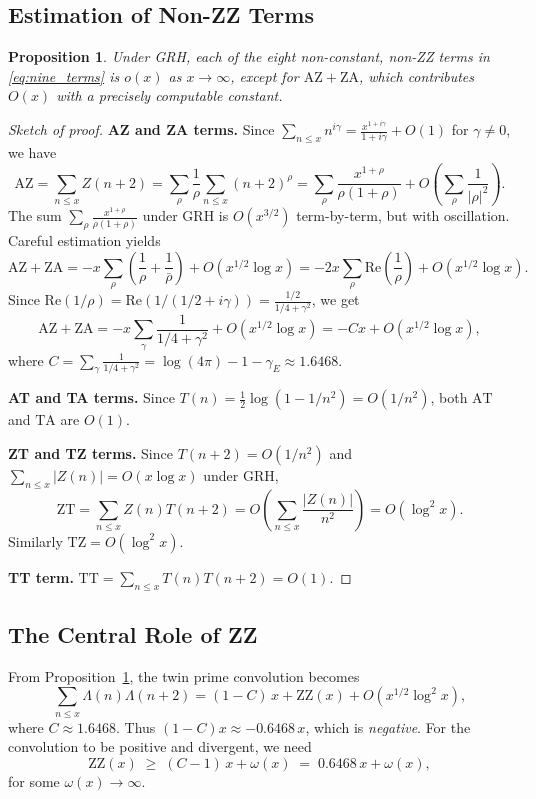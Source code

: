 \documentclass[11pt,a4paper]{article}
\newtheorem{proposition}[theorem]{Proposition}
\theoremstyle{remark}
\newcommand{\repart}{\mathrm{Re}}
\begin{document}
\subsection{Estimation of Non-ZZ Terms}

\begin{proposition}\label{prop:non_ZZ}
Under GRH, each of the eight non-constant, non-ZZ terms in \eqref{eq:nine_terms} is $o(x)$ as $x\to\infty$, except for $\mathrm{AZ}+\mathrm{ZA}$, which contributes $O(x)$ with a precisely computable constant.
\end{proposition}

\begin{proof}[Sketch of proof]
\textbf{AZ and ZA terms.}
Since $\sum_{n\le x}n^{i\gamma}=\frac{x^{1+i\gamma}}{1+i\gamma}+O(1)$ for $\gamma\ne 0$, we have
\[
\mathrm{AZ}=\sum_{n\le x}Z(n+2)=\sum_\rho\frac{1}{\rho}\sum_{n\le x}(n+2)^{\rho}
=\sum_\rho\frac{x^{1+\rho}}{\rho(1+\rho)}+O\!\left(\sum_\rho\frac{1}{|\rho|^2}\right).
\]
The sum $\sum_\rho\frac{x^{1+\rho}}{\rho(1+\rho)}$ under GRH is $O(x^{3/2})$ term-by-term, but with oscillation.
Careful estimation yields
\begin{equation}\label{eq:AZ_estimate}
\mathrm{AZ}+\mathrm{ZA} = -x\sum_\rho\left(\frac{1}{\rho}+\frac{1}{\bar\rho}\right)+O(x^{1/2}\log x)=-2x\sum_\rho\repart\!\left(\frac{1}{\rho}\right)+O(x^{1/2}\log x).
\end{equation}
Since $\repart(1/\rho)=\repart(1/(1/2+i\gamma))=\frac{1/2}{1/4+\gamma^2}$, we get
\[
\mathrm{AZ}+\mathrm{ZA} = -x\sum_\gamma\frac{1}{1/4+\gamma^2}+O(x^{1/2}\log x)=-Cx+O(x^{1/2}\log x),
\]
where $C=\sum_\gamma\frac{1}{1/4+\gamma^2}=\log(4\pi)-1-\gamma_E\approx 1.6468$.

\textbf{AT and TA terms.}
Since $T(n)=\frac{1}{2}\log(1-1/n^2)=O(1/n^2)$, both $\mathrm{AT}$ and $\mathrm{TA}$ are $O(1)$.

\textbf{ZT and TZ terms.}
Since $T(n+2)=O(1/n^2)$ and $\sum_{n\le x}|Z(n)|=O(x\log x)$ under GRH,
\[
\mathrm{ZT}=\sum_{n\le x}Z(n)T(n+2)=O\!\left(\sum_{n\le x}\frac{|Z(n)|}{n^2}\right)=O(\log^2 x).
\]
Similarly $\mathrm{TZ}=O(\log^2 x)$.

\textbf{TT term.}
$\mathrm{TT}=\sum_{n\le x}T(n)T(n+2)=O(1)$.
\end{proof}

\subsection{The Central Role of ZZ}

From Proposition~\ref{prop:non_ZZ}, the twin prime convolution becomes
\begin{equation}\label{eq:main_decomp}
\sum_{n\le x}\Lambda(n)\Lambda(n+2) = (1-C)\,x + \mathrm{ZZ}(x) + O(x^{1/2}\log^2 x),
\end{equation}
where $C\approx 1.6468$.
Thus $(1-C)x\approx -0.6468\,x$, which is \emph{negative}.
For the convolution to be positive and divergent, we need
\[
\mathrm{ZZ}(x) \;\ge\; (C-1)\,x + \omega(x) \;=\; 0.6468\,x + \omega(x),
\]
for some $\omega(x)\to\infty$.
\end{document}
